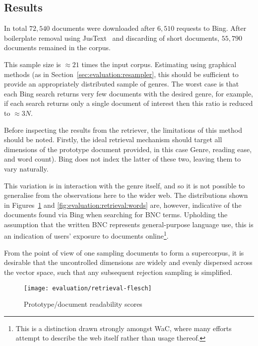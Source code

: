 \subsection{Results}
\label{sec:evaluation:results}

In total $72,540$ documents were downloaded after $6,510$ requests to Bing.  After boilerplate removal using JusText~\cite{pomikalek2013justext} and discarding of short documents, $55,790$ documents remained in the corpus.


This sample size is $\approx 21$ times the input corpus.  Estimating using graphical methods (as in Section~\ref{sec:evaluation:resampler}, this should be sufficient to provide an appropriately distributed sample of genres.  The worst case is that each Bing search returns very few documents with the desired genre, for example, if each search returns only a single document of interest then this ratio is reduced to $\approx 3N$.



Before inspecting the results from the retriever, the limitations of this method should be noted.  Firstly, the ideal retrieval mechanism should target all dimensions of the prototype document provided, in this case Genre, reading ease, and word count).  Bing does not index the latter of these two, leaving them to vary naturally.

This variation is in interaction with the genre itself, and so it is not possible to generalise from the observations here to the wider web.  The distributions shown in Figures~\ref{fig:evaluation:retrieval:flesh} and \ref{fig:evaluation:retrieval:words} are, however, indicative of the documents found via Bing when searching for BNC terms.  Upholding the assumption that the written BNC represents general-purpose language use, this is an indication of users' exposure to documents online\footnote{This is a distinction drawn strongly amongst WaC, where many efforts attempt to describe the web itself rather than usage thereof.}.

From the point of view of one sampling documents to form a supercorpus, it is desirable that the uncontrolled dimensions are widely and evenly dispersed across the vector space, such that any subsequent rejection sampling is simplified.


\begin{figure}[Ht]
    \centering
    \texttt{[image: evaluation/retrieval-flesch]}
    \caption{Prototype/document readability scores}
    \label{fig:evaluation:retrieval:flesh}
\end{figure}

